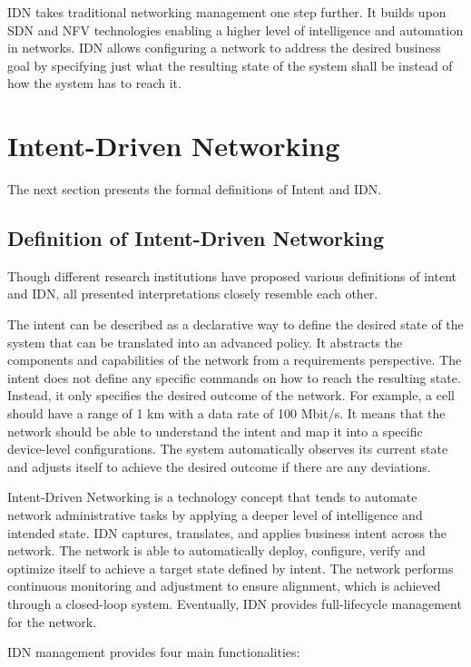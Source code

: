 IDN takes traditional networking management one step further. It builds upon SDN and NFV technologies enabling a higher level of intelligence and automation in networks. IDN allows configuring a network to address the desired business goal by specifying just what the resulting state of the system shall be instead of how the system has to reach it.


\section{Intent-Driven Networking}
\label{sec:Intent_Driven_Networking}
The next section presents the formal definitions of Intent and IDN. 

\subsection{Definition of Intent-Driven Networking}
Though different research institutions have proposed various definitions of intent and IDN, all presented interpretations closely resemble each other. 

The intent can be described as a declarative way to define the desired state of the system that can be translated into an advanced policy. It abstracts the components and capabilities of the network from a requirements perspective. The intent does not define any specific commands on how to reach the resulting state. Instead, it only specifies the desired outcome of the network. For example, a cell should have a range of 1 km with a data rate of 100 Mbit/s.\cite{Mwanje2021} It means that the network should be able to understand the intent and map it into a specific device-level configurations.  The system automatically observes its current state and adjusts itself to achieve the desired outcome if there are any deviations. \cite[22867]{8968429}

Intent-Driven Networking is a technology concept that tends to automate network administrative tasks by applying a deeper level of intelligence and intended state. IDN captures, translates, and applies business intent across the network. The network is able to automatically deploy, configure, verify and optimize itself to achieve a target state defined by intent. The network performs continuous monitoring and adjustment to ensure alignment, which is achieved through a closed-loop system. Eventually, IDN provides full-lifecycle management for the network.\cite{8968429}

IDN management provides four main functionalities\cite[271]{Wei2020}: 

